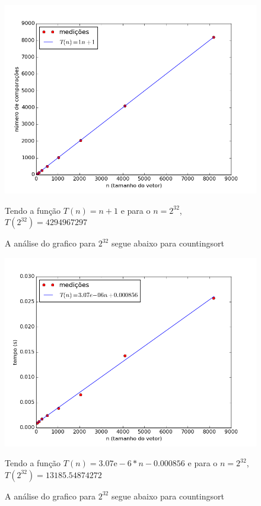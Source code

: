 \documentclass[12pt,a4paper,twoside]{report}
\begin{document}
\begin{figure}[ht]
\centering \includegraphics[scale=0.8]{../countingsort/imagens/countingsortQuaseDecresc201.png}
\caption{A análise do grafico para $2^{32}$ segue abaixo para countingsort}

Tendo a função $T(n) = n+1$ e para o $n =2^{32}$, $T(2^{32}) = 4294967297$ 
\label{fig:countingsortQuaseDecresc201}
\end{figure}

\clearpage


\begin{figure}[ht]
\centering \includegraphics[scale=0.8]{../countingsort/imagens/countingsortQuaseDecresc300.png}
\caption{A análise do grafico para $2^{32}$ segue abaixo para countingsort}

Tendo a função $T(n) = 3.07\mathrm{e}-6*n-0.000856$ e para o $n =2^{32}$, $T(2^{32}) = 13185.54874272$ 
\label{fig:countingsortQuaseDecresc300}
\end{figure}
\end{document}
